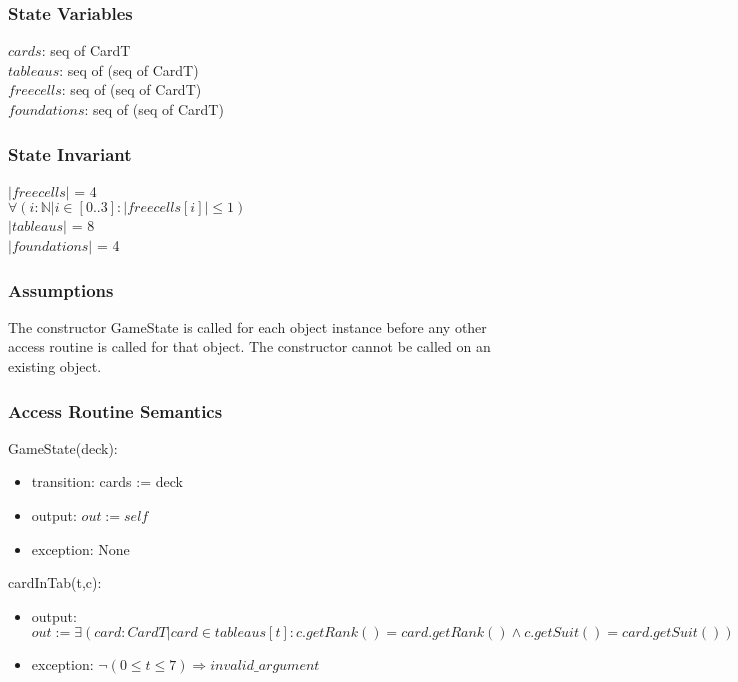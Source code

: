 \documentclass[12pt]{article}
\begin{document}
\subsubsection* {State Variables}

$cards$: seq of CardT\\
$tableaus$: seq of (seq of CardT) \\ 
$freecells$: seq of (seq of CardT) \\ 
$foundations$:  seq of (seq of CardT) \\

\subsubsection* {State Invariant}

$|freecells|$ = 4 \\
$\forall(i : \mathbb{N} | i \in [0..3]: |freecells[i]| \le 1)$ \\
$|tableaus|$ = 8 \\
$|foundations|$ = 4

\subsubsection* {Assumptions}

The constructor GameState is called for each object instance before any other
access routine is called for that object.  The constructor cannot be called on
an existing object.

\subsubsection* {Access Routine Semantics}

GameState(deck):
\begin{itemize}
\item transition: cards := deck
\item output: $out := \mathit{self}$
\item exception: None
\end{itemize}

\noindent cardInTab(t,c):
\begin{itemize}
\item output: $out := \exists(card:CardT|card \in tableaus[t] : c.getRank() = card.getRank() \wedge c.getSuit() = card.getSuit())$
\item exception: $\neg( 0 \le t \le 7) \Rightarrow invalid\_argument$
\end{itemize}
\end{document}
